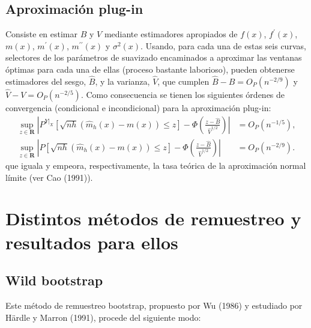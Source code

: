 \documentclass[]{book}
\theoremstyle{definition}
\theoremstyle{definition}
\theoremstyle{definition}
\theoremstyle{remark}
\begin{document}
\subsection{Aproximación plug-in}\label{aproximacion-plug-in-1}

Consiste en estimar \(B\) y \(V\) mediante estimadores apropiados de
\(f\left(x \right)\), \(f^{\prime}\left( x \right)\),
\(m\left( x \right)\), \(m^{\prime}\left( x \right)\),
\(m^{\prime \prime }\left( x \right)\) y \(\sigma^2\left( x \right)\).
Usando, para cada una de estas seis curvas, selectores de los parámetros
de suavizado encaminados a aproximar las ventanas óptimas para cada una
de ellas (proceso bastante laborioso), pueden obtenerse estimadores del
sesgo, \(\hat{B}\), y la varianza, \(\hat{V}\), que cumplen
\(\hat{B}-B=O_{P}\left( n^{-2/9} \right)\) y
\(\hat{V}-V=O_{P}\left( n^{-2/5} \right)\). Como consecuencia se tienen
los siguientes órdenes de convergencia (condicional e incondicional)
para la aproximación plug-in: \[\begin{aligned}
\sup_{z\in \boldsymbol{R}}\left\vert P^{\left. Y\right\vert _{X}}\left[ 
\sqrt{nh}\left( \hat{m}_{h}\left( x \right) -m\left( x \right) \right) \leq z
\right] -\Phi \left( \frac{z-\hat{B}}{\hat{V}^{1/2}} \right) \right\vert
&= O_{P}\left( n^{-1/5} \right), \\
\sup_{z\in \boldsymbol{R}}\left\vert P\left[ \sqrt{nh}\left( \hat{m}
_{h}\left( x \right) -m\left( x \right) \right) \leq z\right] -\Phi \left( 
\frac{z-\hat{B}}{\hat{V}^{1/2}} \right) \right\vert &= O_{P}\left(
n^{-2/9} \right).
\end{aligned}\] que iguala y empeora, respectivamente, la tasa teórica
de la aproximación normal límite (ver Cao (1991)).

\section{Distintos métodos de remuestreo y resultados para
ellos}\label{distintos-metodos-de-remuestreo-y-resultados-para-ellos}

\subsection{Wild bootstrap}\label{wild-bootstrap}

Este método de remuestreo bootstrap, propuesto por Wu (1986) y estudiado
por Härdle y Marron (1991), procede del siguiente modo:
\end{document}
